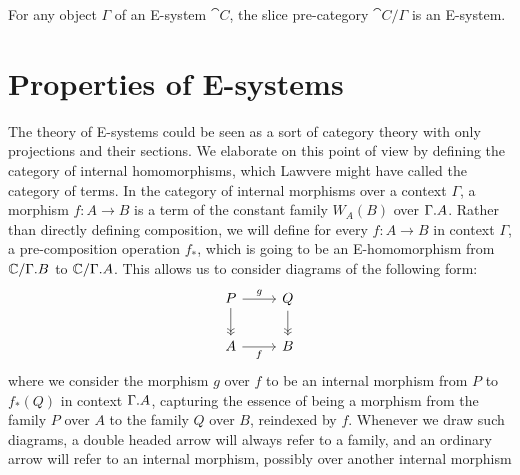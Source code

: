 \begin{cor}
For any object $\Gamma$ of an E-system $\cat{C}$, the slice pre-category $\cat{C}/\Gamma$
is an E-system.
\end{cor}

\begin{comment}
\begin{rmk}[Needs more precision]
Consider the category $E$ generated by the graph consisting of the objects of 
the underlying category of an $E$-system $\mathcal{E}$ as edges, and the morphisms
$S_t:X\to Y$ and $W_A:Y\to X$ as edges, subject to the axioms of an $E$-systems.
 
Any morphism of $E$ can be rewritten in a unique way
as a composition $\tilde S\circ \tilde W$, where $\tilde S$ is a morphism in
substitution-normal form, $\tilde W$ is in weakening normal form, every term
expression is in normal form, and where
each occurence of $S_x\circ W_A$ and $S_{\tfid{A}}\circ W_A/A$ is eliminated.
\end{rmk}
\end{comment}

\section{Properties of E-systems}\label{sec:esys_props}

The theory of E-systems could be seen as a sort of category theory with only
projections and their sections. We elaborate on this point of view by defining
the category of internal homomorphisms, which Lawvere might have called the
category of terms. 
In the category of internal morphisms over a context $\Gamma$,
a morphism $f:A\to B$ is a term of the constant family $W_A(B)$ over 
$\ctxext{\Gamma}{A}$. Rather than directly defining composition, we will define
for every $f:A\to B$ in context $\Gamma$, a pre-composition operation
$f_\ast$, which is going to be an E-homomorphism from 
$\cat{C}/\ctxext{\Gamma}{B}$ to $\cat{C}/\ctxext{\Gamma}{A}$. This allows us
to consider diagrams of the following form:
\begin{equation*}
\begin{tikzcd}
P \arrow[d,->>] \arrow[r,"g"] & Q \arrow[d,->>] \\
A \arrow[r,swap,"f"] & B
\end{tikzcd}
\end{equation*}
where we consider the morphism $g$ over $f$ to be an internal morphism from 
$P$ to $f_\ast(Q)$ in context $\ctxext{\Gamma}{A}$, capturing the
essence of being a morphism from the family $P$ over $A$ to the family
$Q$ over $B$, reindexed by $f$. 
Whenever we draw such diagrams, a double headed arrow will always
refer to a family, and an ordinary arrow will refer to an internal morphism,
possibly over another internal morphism 

